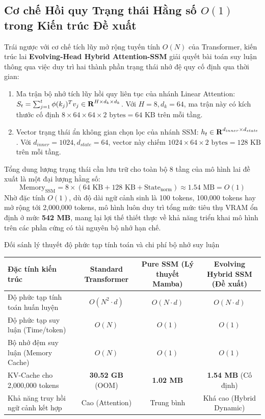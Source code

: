 \documentclass{uetgraduation}
\renewcommand{\mathbb}[1]{\text{\textbf{#1}}}
\begin{document}
\subsection{Cơ chế Hồi quy Trạng thái Hằng số $O(1)$ trong Kiến trúc Đề xuất}
Trái ngược với cơ chế tích lũy mở rộng tuyến tính $O(N)$ của Transformer, kiến trúc lai \textbf{Evolving-Head Hybrid Attention-SSM} giải quyết bài toán suy luận thông qua việc duy trì hai thành phần trạng thái nhớ đệ quy cố định qua thời gian:
\begin{enumerate}
    \item Ma trận bộ nhớ tích lũy hồi quy liên tục của nhánh Linear Attention: $S_t = \sum_{j=1}^t \phi(k_j)^T v_j \in \mathbb{R}^{H \times d_k \times d_k}$. Với $H=8, d_k=64$, ma trận này có kích thước cố định $8 \times 64 \times 64 \times 2\text{ bytes} = 64\text{ KB}$ trên mỗi tầng.
    \item Vector trạng thái ẩn không gian chọn lọc của nhánh SSM: $h_t \in \mathbb{R}^{d_{inner} \times d_{state}}$. Với $d_{inner}=1024, d_{state}=64$, vector này chiếm $1024 \times 64 \times 2\text{ bytes} = 128\text{ KB}$ trên mỗi tầng.
\end{enumerate}
Tổng dung lượng trạng thái cần lưu trữ cho toàn bộ 8 tầng của mô hình lai đề xuất là một đại lượng hằng số:
\begin{equation}
\text{Memory}_{\text{SSM}} = 8 \times (64\text{ KB} + 128\text{ KB} + \text{State}_{\text{norm}}) \approx 1.54\text{ MB} = O(1)
\end{equation}
Nhờ đặc tính $O(1)$, dù độ dài ngữ cảnh sinh là 100 tokens, 100,000 tokens hay mở rộng tới 2,000,000 tokens, mô hình luôn duy trì tổng mức tiêu thụ VRAM ổn định ở mức \textbf{542 MB}, mang lại lợi thế thiết thực về khả năng triển khai mô hình trên các phần cứng có tài nguyên bộ nhớ hạn chế.

\begin{table}{Đối sánh lý thuyết độ phức tạp tính toán và chi phí bộ nhớ suy luận}
\centering
\small
\begin{tabular}{lccc}
\hline
\textbf{Đặc tính kiến trúc} & \textbf{Standard Transformer} & \textbf{Pure SSM (Lý thuyết Mamba)} & \textbf{Evolving Hybrid SSM (Đề xuất)} \\ \hline
Độ phức tạp tính toán huấn luyện & $O(N^2 \cdot d)$ & $O(N \cdot d)$ & $O(N \cdot d)$ \\
Độ phức tạp suy luận (Time/token) & $O(N)$ & $O(1)$ & $O(1)$ \\
Bộ nhớ đệm suy luận (Memory Cache) & $O(N)$ & $O(1)$ & $O(1)$ \\
KV-Cache cho 2,000,000 tokens & \textbf{30.52 GB} (OOM) & \textbf{1.02 MB} & \textbf{1.54 MB} (Cố định) \\
Khả năng truy hồi ngữ cảnh kết hợp & Cao (Attention) & Trung bình & Khá cao (Hybrid Dynamic) \\ \hline
\end{tabular}
\end{table}
\end{document}
